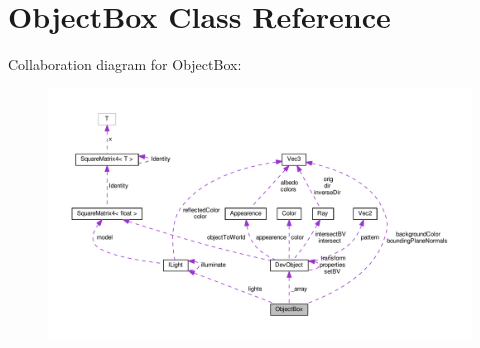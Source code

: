\hypertarget{class_object_box}{}\section{Object\+Box Class Reference}
\label{class_object_box}


Collaboration diagram for Object\+Box\+:
\nopagebreak
\begin{figure}[H]
\begin{center}
\leavevmode
\includegraphics[width=350pt]{class_object_box__coll__graph}
\end{center}
\end{figure}
